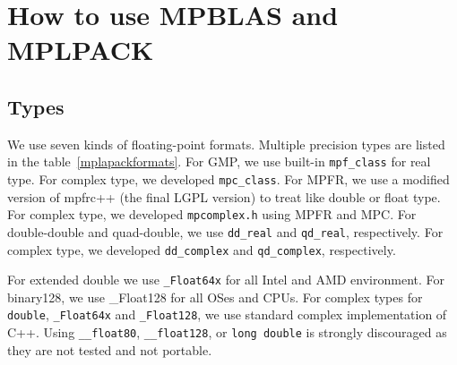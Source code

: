 \documentclass[12pt]{article}
\begin{document}
\section{How to use MPBLAS and MPLPACK}
\label{sec:howtouse}
\subsection{Types}
We use seven kinds of floating-point formats. Multiple precision types are listed in the table~\ref{mplapackformats}.
For GMP, we use built-in {\tt mpf\_class} for real type. For complex type, we developed {\tt mpc\_class}.
For MPFR, we use a modified version of mpfrc++ (the final LGPL version) to treat like double or float type. For complex type,
we developed {\tt mpcomplex.h} using MPFR and MPC.
For double-double and quad-double, we use {\tt dd\_real} and {\tt qd\_real}, respectively. For complex type, we developed {\tt dd\_complex} and {\tt qd\_complex}, respectively.

For extended double we use {\tt \_Float64x} for all Intel and AMD environment. For binary128, we use {\_Float128} for
all OSes and CPUs. For complex types for {\tt double}, {\tt \_Float64x} and {\tt \_Float128}, we use standard complex implementation of C++. Using {\tt \_\_float80}, {\tt \_\_float128}, or {\tt long double} is strongly discouraged as they are not tested and not portable.
\end{document}
